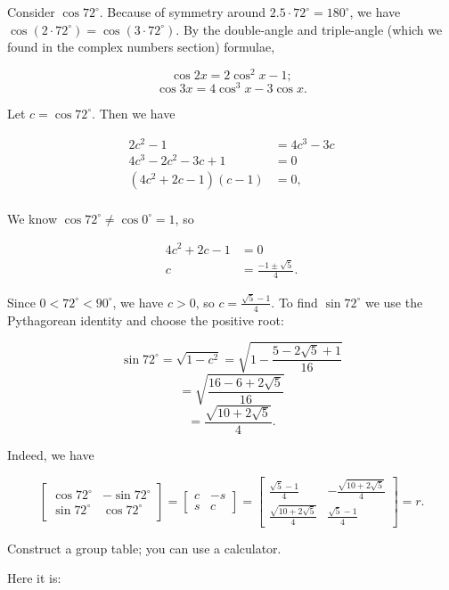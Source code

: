 \documentclass[../key.tex]{subfiles}
\begin{document}
Consider $\cos 72^\circ$. Because of symmetry around $2.5\cdot 72^\circ=180^\circ$, we have $\cos (2\cdot 72^\circ) = \cos (3\cdot 72^\circ)$. By the double-angle and triple-angle (which we found in the complex numbers section) formulae,

$$\cos 2x = 2\cos^2 x - 1;$$
$$\cos 3x = 4\cos^3 x - 3\cos x.$$

Let $c = \cos 72^\circ$. Then we have

\begin{align*}
2c^2 - 1 &= 4c^3 - 3c \\
4c^3 - 2c^2 - 3c + 1 &= 0 \\
(4c^2 + 2c - 1)(c-1) &= 0, \\
\end{align*}

We know $\cos 72^\circ \neq \cos 0^\circ = 1$, so

\begin{align*}
4c^2 + 2c - 1 &= 0 \\
c &= \frac{-1\pm \sqrt{5}}{4}.
\end{align*}

Since $0 < 72^\circ < 90^\circ$, we have $c > 0$, so $c=\frac{\sqrt{5}-1}{4}$. To find $\sin 72^\circ$ we use the Pythagorean identity and choose the positive root:

$$\sin 72^\circ = \sqrt{1 - c^2} = \sqrt{1 - \frac{5 - 2\sqrt{5} + 1}{16}}$$
$$=\sqrt{\frac{16 - 6 + 2\sqrt{5}}{16}}$$
$$=\frac{\sqrt{10+2\sqrt{5}}}{4}.$$

Indeed, we have

$$\begin{bmatrix} \cos 72^\circ & -\sin 72^\circ \\ \sin 72^\circ & \cos 72^\circ \end{bmatrix} = \begin{bmatrix} c & -s \\ s & c \end{bmatrix} = \begin{bmatrix} \frac{\sqrt{5}-1}{4} & -\frac{\sqrt{10+2\sqrt{5}}}{4} \\ \frac{\sqrt{10+2\sqrt{5}}}{4} & \frac{\sqrt{5}-1}{4} \end{bmatrix} = r.$$

\begin{iinner_problem}
\item Construct a group table; you can use a calculator.
\end{iinner_problem}

Here it is:
\end{document}
